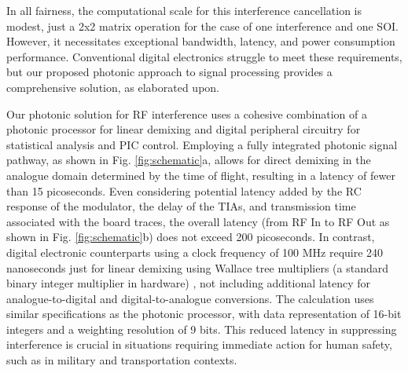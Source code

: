 \documentclass[pdflatex,mathphys]{sty}%
\begin{document}
In all fairness, the computational scale for this interference cancellation is modest, just a 2x2 matrix operation for the case of one interference and one SOI. However, it necessitates exceptional bandwidth, latency, and power consumption performance. Conventional digital electronics struggle to meet these requirements, but our proposed photonic approach to signal processing provides a comprehensive solution, as elaborated upon.

Our photonic solution for RF interference uses a cohesive combination of a photonic processor for linear demixing and digital peripheral circuitry for statistical analysis and PIC control. Employing a fully integrated photonic signal pathway, as shown in Fig. \ref{fig:schematic}a, allows for direct demixing in the analogue domain determined by the time of flight, resulting in a latency of fewer than 15 picoseconds. Even considering potential latency added by the RC response of the modulator, the delay of the TIAs, and transmission time associated with the board traces, the overall latency (from RF In to RF Out as shown in Fig. \ref{fig:schematic}b) does not exceed 200 picoseconds. In contrast, digital electronic counterparts using a clock frequency of 100 MHz require 240 nanoseconds just for linear demixing using Wallace tree multipliers (a standard binary integer multiplier in hardware) \cite{wallace1964suggestion}, not including additional latency for analogue-to-digital and digital-to-analogue conversions. The calculation uses similar specifications as the photonic processor, with data representation of 16-bit integers and a weighting resolution of 9 bits. This reduced latency in suppressing interference is crucial in situations requiring immediate action for human safety, such as in military and transportation contexts.
\end{document}
